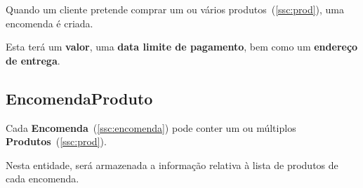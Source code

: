\documentclass[12pt, a4paper]{article}
\begin{document}
Quando um cliente pretende comprar um ou v\'arios produtos~(\ref{ssc:prod}),
uma encomenda \'e criada.

Esta ter\'a um \textbf{valor}, uma \textbf{data limite de pagamento},
bem como um \textbf{endere\c{c}o de entrega}.



\subsection{Encomenda{\textendash}Produto}\label{ssc:encomenda_prod}

Cada \textbf{Encomenda}~(\ref{ssc:encomenda}) pode conter um ou
m\'ultiplos \textbf{Produtos}~(\ref{ssc:prod}).

Nesta entidade, ser\'a armazenada a informação relativa \`a
lista de produtos de cada encomenda.

\end{document}
